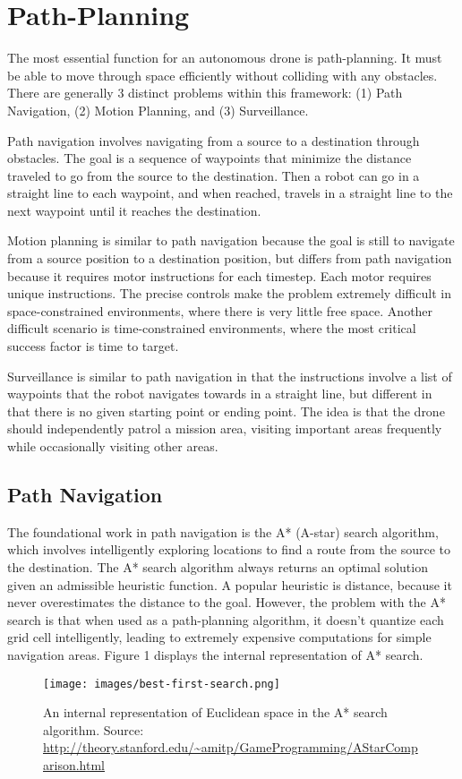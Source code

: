 \documentclass[12pt]{article}
\begin{document}
\section{Path-Planning}
The most essential function for an autonomous drone is path-planning. It must be able to move through space efficiently without colliding with any obstacles. There are generally 3 distinct problems within this framework: (1) Path Navigation, (2) Motion Planning, and (3) Surveillance.

Path navigation involves navigating from a source to a destination through obstacles. The goal is a sequence of waypoints that minimize the distance traveled to go from the source to the destination. Then a robot can go in a straight line to each waypoint, and when reached, travels in a straight line to the next waypoint until it reaches the destination.

Motion planning is similar to path navigation because the goal is still to navigate from a source position to a destination position, but differs from path navigation because it requires motor instructions for each timestep. Each motor requires unique instructions. The precise controls make the problem extremely difficult in space-constrained environments, where there is very little free space. Another difficult scenario is time-constrained environments, where the most critical success factor is time to target.

Surveillance is similar to path navigation in that the instructions involve a list of waypoints that the robot navigates towards in a straight line, but different in that there is no given starting point or ending point. The idea is that the drone should independently patrol a mission area, visiting important areas frequently while occasionally visiting other areas.

\subsection{Path Navigation}
The foundational work in path navigation is the A* (A-star) search algorithm, which involves intelligently exploring locations to find a route from the source to the destination. \cite{hartFormalBasisHeuristic1968} The A* search algorithm always returns an optimal solution given an admissible heuristic function. A popular heuristic is distance, because it never overestimates the distance to the goal. However, the problem with the A* search is that when used as a path-planning algorithm, it doesn't quantize each grid cell intelligently, leading to extremely expensive computations for simple navigation areas. Figure 1 displays the internal representation of A* search.
\begin{figure}[h]
    \centering
    \texttt{[image: images/best-first-search.png]}
    \caption{An internal representation of Euclidean space in the A* search algorithm. Source: \url{http://theory.stanford.edu/~amitp/GameProgramming/AStarComparison.html}}
    \label{fig:astar}
\end{figure}
\end{document}
